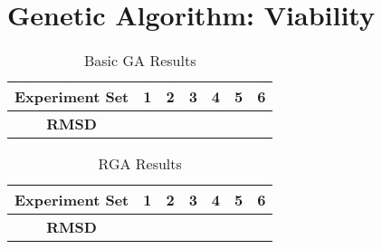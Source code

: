 \section{Genetic Algorithm: Viability}

\begin{table}
	\label{table:basic-ga-results}
	\centering
	\begin{tabular}{ | >{\bfseries}c | c | c | c | c | c | c | }
		\hline
		Experiment Set & 1 & 2 & 3 & 4 & 5 & 6 \\ \hline
		RMSD &  &  &  &  &  &  \\ \hline
	\end{tabular}
	\caption{Basic GA Results}
\end{table}

\begin{table}
	\label{table:rga-results}
	\centering
	\begin{tabular}{ | >{\bfseries}c | c | c | c | c | c | c | }
		\hline
		Experiment Set & 1 & 2 & 3 & 4 & 5 & 6 \\ \hline
		RMSD &  &  &  &  &  &  \\ \hline
	\end{tabular}
	\caption{RGA Results}
\end{table}